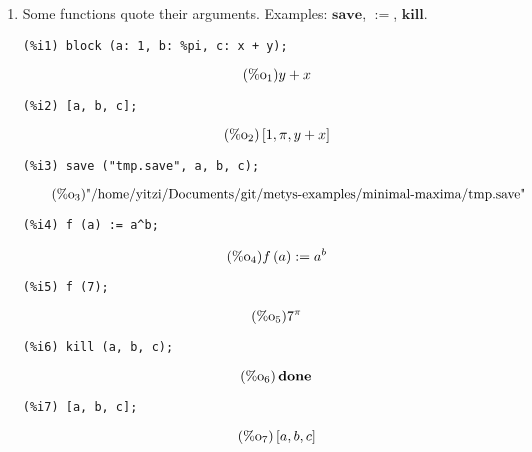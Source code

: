 \documentclass[12pt,leqno]{article}
\begin{document}
\begin{enumerate}
\item Some functions quote their arguments.
Examples: $\mathbf{save}$, $\mathbf{:=}$, $\mathbf{kill}$.
\begin{verbatim}
(%i1) block (a: 1, b: %pi, c: x + y);
\end{verbatim}
\begin{equation}
\tag{$\mathop{\mathrm{\%o}_{1}}$}y+x
\label{eq:doc-group1-code15-1-1}
\end{equation}
\begin{verbatim}
(%i2) [a, b, c];
\end{verbatim}
\begin{equation}
\tag{$\mathop{\mathrm{\%o}_{2}}$}\left[1, \pi, y+x\right]
\label{eq:doc-group1-code15-2-1}
\end{equation}
\begin{verbatim}
(%i3) save ("tmp.save", a, b, c);
\end{verbatim}
\begin{equation}
\tag{$\mathop{\mathrm{\%o}_{3}}$}\mbox{"/home/yitzi/Documents/git/metys-examples/minimal-maxima/tmp.save"}
\label{eq:doc-group1-code15-3-1}
\end{equation}
\begin{verbatim}
(%i4) f (a) := a^b;
\end{verbatim}
\begin{equation}
\tag{$\mathop{\mathrm{\%o}_{4}}$}f\left(a\right) := {a}^{b}
\label{eq:doc-group1-code15-4-1}
\end{equation}
\begin{verbatim}
(%i5) f (7);
\end{verbatim}
\begin{equation}
\tag{$\mathop{\mathrm{\%o}_{5}}$}{7}^{\pi}
\label{eq:doc-group1-code15-5-1}
\end{equation}
\begin{verbatim}
(%i6) kill (a, b, c);
\end{verbatim}
\begin{equation}
\tag{$\mathop{\mathrm{\%o}_{6}}$}\mathop{\mathbf{done}}
\label{eq:doc-group1-code15-6-1}
\end{equation}
\begin{verbatim}
(%i7) [a, b, c];
\end{verbatim}
\begin{equation}
\tag{$\mathop{\mathrm{\%o}_{7}}$}\left[a, b, c\right]
\label{eq:doc-group1-code15-7-1}
\end{equation}



\end{enumerate}
\end{document}
